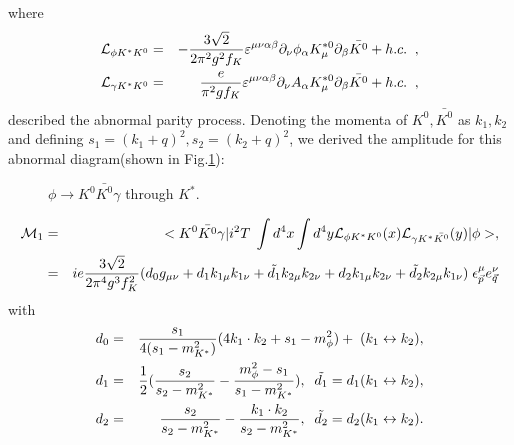 where
\begin{eqnarray}
{\cal L}_{\phi K^* K^0}&=&
-\frac{3 \sqrt 2}{2\pi^2 g^2 f_K}\varepsilon^{\mu\nu\alpha\beta}
\partial_\nu\phi_\alpha K^{*0}_\mu\partial_\beta\bar{K^0} + h.c. {\;\;},\\
{\cal L}_{\gamma K^* K^0}&=&
\frac{e}{\pi^2 g f_K}\varepsilon^{\mu\nu\alpha\beta}
\partial_\nu A_\alpha K^{*0}_\mu\partial_\beta\bar{K^0} + h.c.{\;\;},
\end{eqnarray}
described the abnormal parity process. Denoting the momenta of $K^0,\bar
{K^0}$ as $k_1, k_2$ and defining $s_1=(k_1+q)^2, s_2=(k_2+q)^2$, we
derived the amplitude for this abnormal diagram(shown in
Fig.\ref{figure:2(a)}):
\begin{figure}[hpt]
   \centering
   \caption{$\phi \to K^0 \bar {K^0} \gamma$ through $K^*$.
}
   \label{figure:2(a)}
\end{figure}
\begin{eqnarray}
{\cal M}_1&=&<K^0 \bar{K^0} \gamma \vert i^2 T\;\int d^4 x \int d^4 y
{\cal L}_{\phi K^* K^0}(x){\cal L}_{\gamma K^* \bar{K^0}}(y) \vert
\phi>,\nonumber \\
&=&ie\frac{3\sqrt 2}{2\pi^4 g^3 f_K^2}
(d_0 g_{\mu \nu}+d_1 k_{1\mu} k_{1\nu} 
                                + \tilde {d_1} k_{2\mu} k_{2\nu}
                                +d_2 k_{1\mu} k_{2\nu}
                                + \tilde {d_2} k_{2\mu} k_{1\nu})
{\;}\epsilon^{\mu}_{\vec p}e^{\nu}_{\vec q} 
\end{eqnarray}
with
\begin{eqnarray}
d_0&=&\frac{s_1}{4(s_1-m_{K^*}^2)}(4k_1 \cdot k_2+s_1-m_\phi^2)
        +{\;} (k_1 \leftrightarrow k_2) ,\nonumber \\
d_1&=&{1 \over 2}(\frac{s_2}{s_2-m_{K^*}^2}
                 -\frac{m_\phi^2-s_1}{s_1-m_{K^*}^2}),{\;\;}
\tilde {d_1}=d_1(k_1 \leftrightarrow k_2),\nonumber \\
d_2&=&\frac{s_2}{s_2-m_{K^*}^2}-\frac{k_1 \cdot k_2}{s_2-m_{K^*}^2},
{\;\;}\tilde {d_2}=d_2(k_1 \leftrightarrow k_2).
\end{eqnarray}

